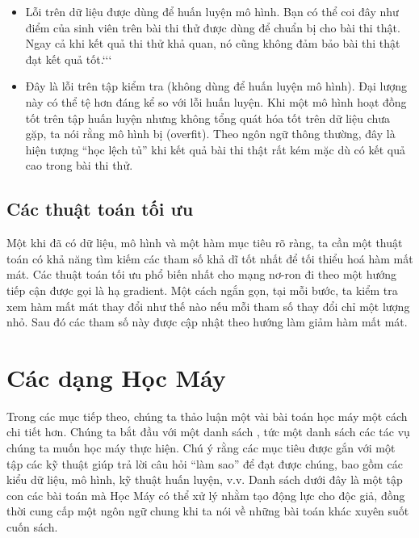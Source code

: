\documentclass[letterpaper,11pt,english]{sphinxmanual}
\begin{document}
\begin{itemize}
\item {} 
 Lỗi trên dữ liệu được dùng để huấn luyện mô hình.
Bạn có thể coi đây như điểm của sinh viên trên bài thi thử được dùng
để chuẩn bị cho bài thi thật. Ngay cả khi kết quả thi thử khả quan,
nó cũng không đảm bảo bài thi thật đạt kết quả tốt.{}`{}`{}`

\item {} 
 Đây là lỗi trên tập kiểm tra (không dùng để huấn
luyện mô hình). Đại lượng này có thể tệ hơn đáng kể so với lỗi huấn
luyện. Khi một mô hình hoạt đồng tốt trên tập huấn luyện nhưng không
tổng quát hóa tốt trên dữ liệu chưa gặp, ta nói rằng mô hình bị  (overfit). Theo ngôn ngữ thông thường, đây là hiện tượng “học
lệch tủ” khi kết quả bài thi thật rất kém mặc dù có kết quả cao trong
bài thi thử.

\end{itemize}








\subsection{Các thuật toán tối ưu}
\label{\detokenize{chapter_introduction/index_vn:cac-thuat-toan-toi-uu}}


Một khi đã có dữ liệu, mô hình và một hàm mục tiêu rõ ràng, ta cần một
thuật toán có khả năng tìm kiếm các tham số khả dĩ tốt nhất để tối thiểu
hoá hàm mất mát. Các thuật toán tối ưu phổ biến nhất cho mạng nơ-ron đi
theo một hướng tiếp cận được gọi là hạ gradient. Một cách ngắn gọn, tại
mỗi bước, ta kiểm tra xem hàm mất mát thay đổi như thế nào nếu mỗi tham
số thay đổi chỉ một lượng nhỏ. Sau đó các tham số này được cập nhật theo
hướng làm giảm hàm mất mát.




\section{Các dạng Học Máy}
\label{\detokenize{chapter_introduction/index_vn:cac-dang-hoc-may}}


Trong các mục tiếp theo, chúng ta thảo luận một vài  bài toán học
máy một cách chi tiết hơn. Chúng ta bắt đầu với một danh sách , tức một danh sách các tác vụ chúng ta muốn học máy thực hiện. Chú
ý rằng các mục tiêu được gắn với một tập các kỹ thuật giúp trả lời câu
hỏi “làm sao” để đạt được chúng, bao gồm các kiểu dữ liệu, mô hình, kỹ
thuật huấn luyện, v.v. Danh sách dưới đây là một tập con các bài toán mà
Học Máy có thể xử lý nhằm tạo động lực cho độc giả, đồng thời cung cấp
một ngôn ngữ chung khi ta nói về những bài toán khác xuyên suốt cuốn
sách.
\end{document}
